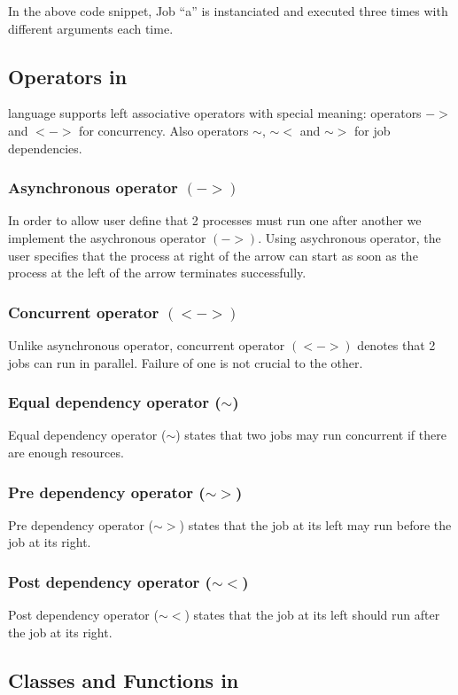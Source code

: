 In the above code snippet, Job ``a'' is instanciated and executed three times
with different arguments each time.



\subsection*{Operators in \lang{}}

\lang{} language supports left associative operators with special meaning: operators $->$ and $<->$ for concurrency. 
Also operators $\sim$, $\sim<$ and $\sim>$ for job dependencies.
\subsubsection*{Asynchronous operator $(->)$}
In order to allow user define that 2 processes must run one after another
we implement the asychronous operator $(->)$. Using asychronous operator, the user
specifies that the process at right of the arrow can start as soon as
the process at the left of the arrow terminates successfully.
\subsubsection*{Concurrent operator $(<->)$}
Unlike asynchronous operator, concurrent operator $(<->)$ denotes that 2 jobs can
run in parallel. Failure of one is not crucial to the other.
\subsubsection*{Equal dependency operator ($\sim$)}
Equal dependency operator ($\sim$) states that two jobs may run concurrent if there
are enough resources.
\subsubsection*{Pre dependency operator ($\sim>$)}
Pre dependency operator ($\sim>$) states that the job at its left may run before the job
at its right.
\subsubsection*{Post dependency operator ($\sim<$)}
Post dependency operator ($\sim<$) states that the job at its left should run after the job
at its right.

\subsection*{Classes and Functions in \lang{}}
